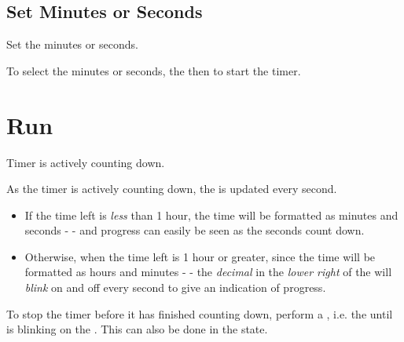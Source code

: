 \subsection{Set Minutes or Seconds} 

Set the minutes or seconds.

\par\medskip

To select the minutes or seconds,  the  then  to start the
timer.


\section{Run} 

Timer is actively counting down.

\par\medskip

As the timer is actively counting down, the  is updated every second.

\begin{itemize}[leftmargin=*]
  \item If the time left is \textit{less} than \num{1} hour, the time will be
    formatted as minutes and seconds -  - and progress can easily be
    seen as the seconds count down.
  \item Otherwise, when the time left is \num{1} hour or greater, since the time
    will be formatted as hours and minutes -  - the \textit{decimal}
    in the \textit{lower right} of the  will \textit{blink} on and off
    every second to give an indication of progress.
\end{itemize}

To stop the timer before it has finished counting down, perform a ,
i.e.  the  until \symD{<<<<} is blinking on the .  This
can also be done in the  state.


